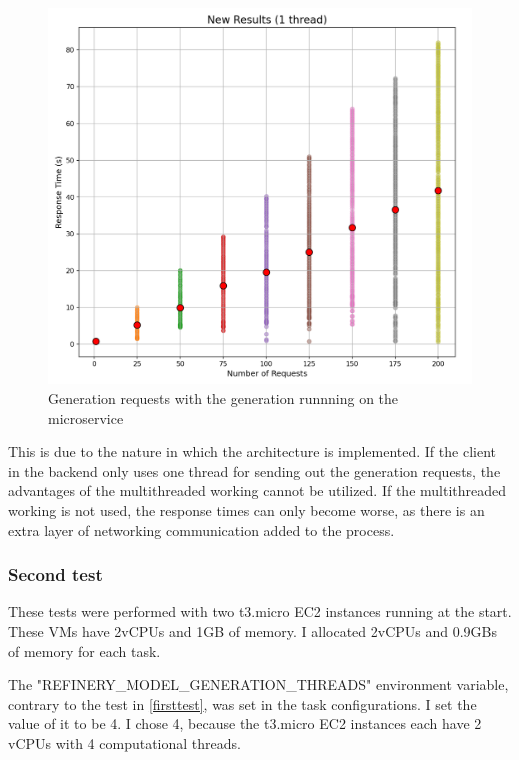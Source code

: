 		\begin{figure}[h!] 
			\begin{center}
				\includegraphics[scale=0.6]{include/imgs/1thread_new.PNG}
				\caption{Generation requests with the generation runnning on the microservice}
				\label{1threadnew}
			\end{center}
		\end{figure}

		This is due to the nature in which the architecture is implemented. If the client in the backend only uses one thread for sending out the 
		generation requests, the advantages of the multithreaded working cannot be utilized. If the multithreaded working is not used, the response times 
		can only become worse, as there is an extra layer of networking communication added to the process. 

		\pagebreak
		\subsubsection{Second test}\label{testtwo}
			These tests were performed with two t3.micro EC2 instances running at the start. These VMs have 2vCPUs and 1GB of memory. I allocated
			2vCPUs and 0.9GBs of memory for each task. 

			The "REFINERY\_MODEL\_GENERATION\_THREADS" environment variable, contrary to the test in \ref{firsttest}, was set in the task configurations. 
			I set the value of it to be 4. I chose 4, because the t3.micro EC2 instances each have 2 vCPUs with 4 computational threads.


